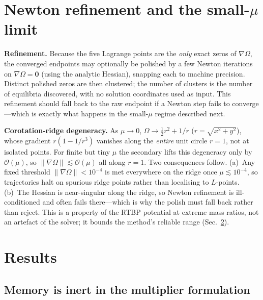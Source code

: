 \documentclass[10pt,twocolumn]{article}
\begin{document}
\section{Newton refinement and the small-$\mu$ limit}\label{sec:refine}

\textbf{Refinement.} Because the five Lagrange points are the \emph{only} exact
zeros of $\nabla\Omega$, the converged endpoints may optionally be polished by a
few Newton iterations on $\nabla\Omega=\mathbf0$ (using the analytic Hessian),
snapping each to machine precision. Distinct polished zeros are then clustered;
the number of clusters is the number of equilibria discovered, with no solution
coordinates used as input. This refinement should fall back to the raw endpoint
if a Newton step fails to converge---which is exactly what happens in the
small-$\mu$ regime described next.

\textbf{Corotation-ridge degeneracy.} As $\mu\to0$, $\Omega\to\tfrac12 r^2+1/r$
($r=\sqrt{x^2+y^2}$), whose gradient $r(1-1/r^3)$ vanishes along the
\emph{entire} unit circle $r=1$, not at isolated points. For finite but tiny
$\mu$ the secondary lifts this degeneracy only by $\mathcal O(\mu)$, so
$\lVert\nabla\Omega\rVert\lesssim\mathcal O(\mu)$ all along $r=1$. Two
consequences follow. (a)~Any fixed threshold $\lVert\nabla\Omega\rVert<10^{-4}$
is met everywhere on the ridge once $\mu\lesssim10^{-4}$, so trajectories halt on
spurious ridge points rather than localising to $L$-points. (b)~The Hessian is
near-singular along the ridge, so Newton refinement is ill-conditioned and often
fails there---which is why the polish must fall back rather than reject. This is
a property of the RTBP potential at extreme mass ratios, not an artefact of the
solver; it bounds the method's reliable range (Sec.~\ref{sec:results}).

\section{Results}\label{sec:results}

\subsection{Memory is inert in the multiplier formulation}
\end{document}
